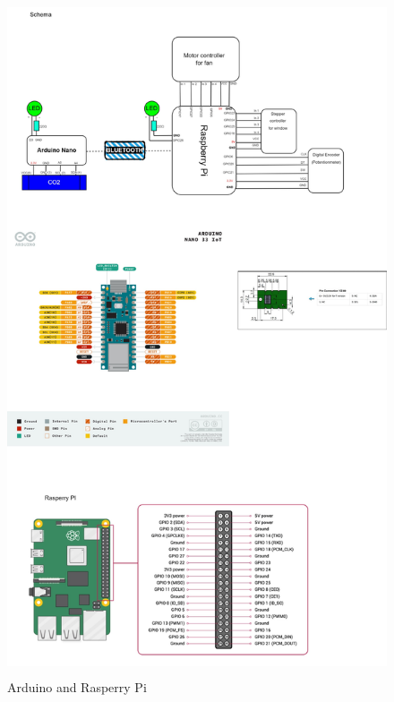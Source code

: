 \begin{figure}[h]
	\includegraphics[height=200mm,left]{images/RoomVentilation_Cabling.jpg}
	\centering
	\caption{Arduino and Rasperry Pi}
	\label{fig:system}
\end{figure}